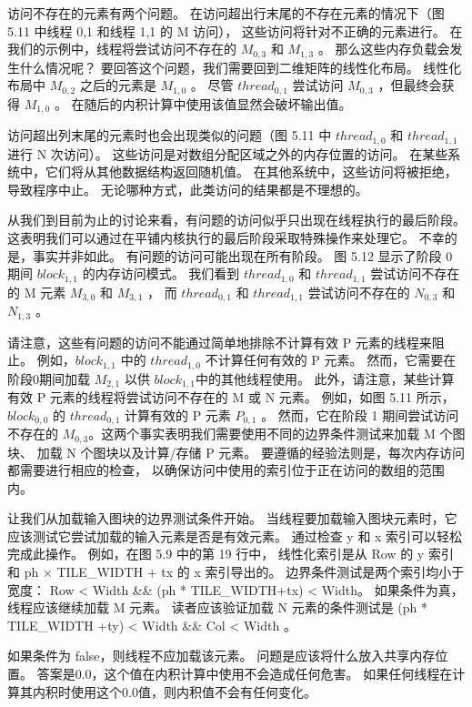 访问不存在的元素有两个问题。 在访问超出行末尾的不存在元素的情况下（图 5.11 中线程 0,1 和线程 1,1 的 M 访问），
这些访问将针对不正确的元素进行。 在我们的示例中，线程将尝试访问不存在的 $M_{0,3}$ 和 $M_{1,3}$ 。 
那么这些内存负载会发生什么情况呢？ 要回答这个问题，我们需要回到二维矩阵的线性化布局。 
线性化布局中 $M_{0,2}$ 之后的元素是 $M_{1,0}$ 。 
尽管 $thread_{0,1}$ 尝试访问 $M_{0,3}$ ，但最终会获得 $M_{1,0}$ 。 
在随后的内积计算中使用该值显然会破坏输出值。

访问超出列末尾的元素时也会出现类似的问题（图 5.11 中 $thread_{1,0}$ 和 $thread_{1,1}$ 进行 N 次访问）。 
这些访问是对数组分配区域之外的内存位置的访问。 在某些系统中，它们将从其他数据结构返回随机值。 
在其他系统中，这些访问将被拒绝，导致程序中止。 无论哪种方式，此类访问的结果都是不理想的。

从我们到目前为止的讨论来看，有问题的访问似乎只出现在线程执行的最后阶段。 
这表明我们可以通过在平铺内核执行的最后阶段采取特殊操作来处理它。 不幸的是，事实并非如此。 
有问题的访问可能出现在所有阶段。 图 5.12 显示了阶段 0 期间 $block_{1,1}$ 的内存访问模式。
我们看到 $thread_{1,0}$ 和 $thread_{1,1}$ 尝试访问不存在的 M 元素 $M_{3,0}$ 和 $M_{3,1}$ ，
而 $thread_{0,1}$ 和 $thread_{1,1}$ 尝试访问不存在的 $N_{0,3}$ 和 $N_{1,3}$ 。

请注意，这些有问题的访问不能通过简单地排除不计算有效 P 元素的线程来阻止。 
例如，$block_{1,1}$ 中的 $thread_{1,0}$ 不计算任何有效的 P 元素。 
然而，它需要在阶段0期间加载 $M_{2,1}$ 以供 $block_{1,1}$中的其他线程使用。 
此外，请注意，某些计算有效 P 元素的线程将尝试访问不存在的 M 或 N 元素。 
例如，如图 5.11 所示，$block_{0,0}$ 的 $thread_{0,1}$ 计算有效的 P 元素 $P_{0,1}$ 。 
然而，它在阶段 1 期间尝试访问不存在的 $M_{0,3}$。这两个事实表明我们需要使用不同的边界条件测试来加载 M 个图块、
加载 N 个图块以及计算/存储 P 元素。 要遵循的经验法则是，每次内存访问都需要进行相应的检查，
以确保访问中使用的索引位于正在访问的数组的范围内。

让我们从加载输入图块的边界测试条件开始。 当线程要加载输入图块元素时，它应该测试它尝试加载的输入元素是否是有效元素。 
通过检查 y 和 x 索引可以轻松完成此操作。 例如，在图 5.9 中的第 19 行中，
线性化索引是从 Row 的 y 索引和 ph × TILE\_WIDTH + tx 的 x 索引导出的。 
边界条件测试是两个索引均小于宽度： Row < Width \&\& (ph * TILE\_WIDTH+tx) < Width。 
如果条件为真，线程应该继续加载 M 元素。 
读者应该验证加载 N 元素的条件测试是 (ph * TILE\_WIDTH +ty) < Width \&\& Col < Width 。

如果条件为 false，则线程不应加载该元素。 问题是应该将什么放入共享内存位置。 
答案是0.0，这个值在内积计算中使用不会造成任何危害。 如果任何线程在计算其内积时使用这个0.0值，则内积值不会有任何变化。

